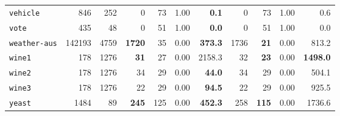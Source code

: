 \begin{tabular}{lccrrrrrrrr}
\texttt{vehicle} & \multicolumn{1}{r}{846} & \multicolumn{1}{r}{252}  & 0 & 73 & 1.00 & \textbf{0.1} & 0 & 73 & 1.00 & 0.6\\
\texttt{vote} & \multicolumn{1}{r}{435} & \multicolumn{1}{r}{48}  & 0 & 51 & 1.00 & \textbf{0.0} & 0 & 51 & 1.00 & 0.0\\
\texttt{weather-aus} & \multicolumn{1}{r}{142193} & \multicolumn{1}{r}{4759}  & \textbf{1720} & 35 & 0.00 & \textbf{373.3} & 1736 & \textbf{21} & 0.00 & 813.2\\
\texttt{wine1} & \multicolumn{1}{r}{178} & \multicolumn{1}{r}{1276}  & \textbf{31} & 27 & 0.00 & 2158.3 & 32 & \textbf{23} & 0.00 & \textbf{1498.0}\\
\texttt{wine2} & \multicolumn{1}{r}{178} & \multicolumn{1}{r}{1276}  & 34 & 29 & 0.00 & \textbf{44.0} & 34 & 29 & 0.00 & 504.1\\
\texttt{wine3} & \multicolumn{1}{r}{178} & \multicolumn{1}{r}{1276}  & 22 & 29 & 0.00 & \textbf{94.5} & 22 & 29 & 0.00 & 925.5\\
\texttt{yeast} & \multicolumn{1}{r}{1484} & \multicolumn{1}{r}{89}  & \textbf{245} & 125 & 0.00 & \textbf{452.3} & 258 & \textbf{115} & 0.00 & 1736.6\\
\bottomrule
\end{tabular}
